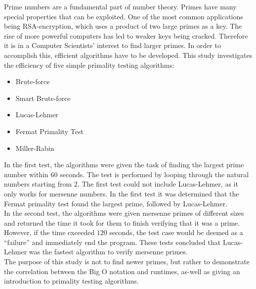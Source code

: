 \documentclass[main.tex]{subfiles}
\begin{document}
Prime numbers are a fundamental part of number theory. Primes have many special
properties that can be exploited. One of the most common applications being
RSA-encryption, which uses a product of two large primes as a key. The rise of
more powerful computers has led to weaker keys being cracked. Therefore it is in
a Computer Scientists' interest to find larger primes. In order to accomplish
this, efficient algorithms have to be developed. This study investigates the
efficiency of five simple primality testing algorithms:
\begin{multicols}{3}
  \begin{itemize}
  \item Brute-force
  \item Smart Brute-force
  \item Lucas-Lehmer
  \item Fermat Primality Test
  \item Miller-Rabin
  \end{itemize}
\end{multicols}

In the first test, the algorithms were given the task of finding the largest
prime number within $60$ seconds. The test is performed by looping through the
natural numbers starting from $2$. The first test could not include
Lucas-Lehmer, as it only works for mersenne numbers. In the first test it was
determined that the Fermat primality test found the largest prime, followed by Lucas-Lehmer. \\

In the second test, the algorithms were given mersenne primes of different sizes
and returned the time it took for them to finish verifying that it was a prime.
However, if the time exceeded $120$ seconds, the test case would be deemed as a
``failure'' and immediately end the program. These tests concluded that
Lucas-Lehmer was the fastest algorithm to verify mersenne primes. \\

The purpose of this study is not to find newer primes, but rather to demonstrate
the correlation between the Big O notation and runtimes, as-well as giving an
introduction to primality testing algorithms. \\
\end{document}
